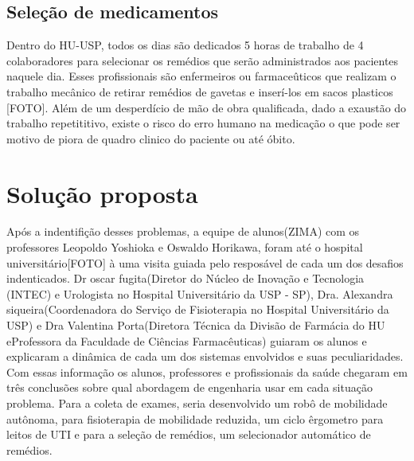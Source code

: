 \documentclass[../poliXuniversity_hospital_(USP)_report.tex]{subfiles}
\begin{document}
\subsection{Seleção de medicamentos}

Dentro do HU-USP, todos os dias são dedicados 5 horas de trabalho de 4 colaboradores para selecionar os remédios que serão administrados aos pacientes naquele dia. Esses profissionais são enfermeiros ou farmaceûticos que realizam o trabalho mecânico de retirar remédios de gavetas e inserí-los em sacos plasticos [FOTO]. Além de um desperdício de mão de obra qualificada, dado a exaustão do trabalho repetititivo, existe o risco do erro humano na medicação o que pode ser motivo de piora de quadro clinico do paciente ou até óbito. 

\section{Solução proposta}

Após a indentifição desses problemas, a equipe de alunos(ZIMA) com os professores Leopoldo Yoshioka e Oswaldo Horikawa, foram até o hospital universitário[FOTO] à uma visita guiada pelo resposável de cada um dos desafios indenticados. Dr oscar fugita(Diretor do Núcleo de Inovação e Tecnologia (INTEC) e Urologista no Hospital Universitário da USP - SP), Dra. Alexandra siqueira(Coordenadora do Serviço de Fisioterapia no Hospital Universitário da USP) e Dra Valentina Porta(Diretora Técnica da Divisão de Farmácia do HU eProfessora da Faculdade de Ciências Farmacêuticas) guiaram os alunos e explicaram a dinâmica de cada um dos sistemas envolvidos e suas peculiaridades. Com essas informação os alunos, professores e profissionais da saúde chegaram em três conclusões sobre qual abordagem de engenharia usar em cada situação problema. Para a coleta de exames, seria desenvolvido um robô de mobilidade autônoma, para fisioterapia de mobilidade reduzida, um ciclo êrgometro para leitos de UTI e para a seleção de remédios, um selecionador automático de remédios.
\end{document}
